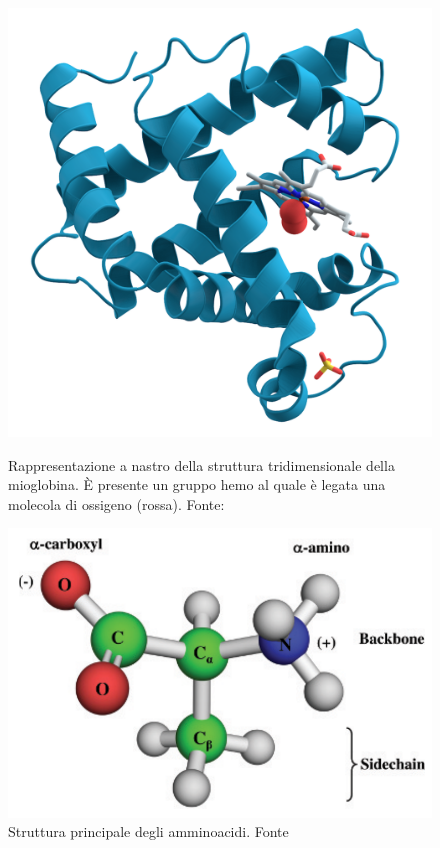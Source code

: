 \begin{figure}[!htb]
	\centering
	\includegraphics[scale=0.15]{images/mioglobina.png}
	\caption{Rappresentazione a nastro della struttura tridimensionale della mioglobina. È presente un gruppo hemo al quale è legata una molecola di ossigeno (rossa). Fonte: \cite{proteinWiki}}
	\label{fig:mioglobina}
	\endminipage\hfill
	\centering
	\includegraphics[scale=0.3]{images/amminoacido.png}
	\caption{Struttura principale degli amminoacidi. Fonte \cite{kessel_ben-tal_2018}}
	\label{fig:amminoacido}
	\endminipage\hfill
\end{figure}

